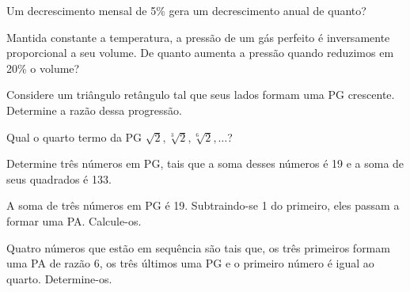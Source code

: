 

\begin{exercise}
    Um decrescimento mensal de 5\% gera um decrescimento anual de
quanto?
\end{exercise}


\begin{exercise}
    Mantida constante a temperatura, a pressão de um gás perfeito é
inversamente proporcional a seu volume. De quanto aumenta a pressão
quando reduzimos em 20\% o volume?
\end{exercise}



\begin{exercise}
    Considere um triângulo retângulo tal que seus lados formam uma
PG crescente. Determine a razão dessa progressão.
\end{exercise}

\begin{exercise}
    Qual o quarto termo da PG $\sqrt 2 , \sqrt[3] 2 , \sqrt[6] 2 ,
\dots$?
\end{exercise}

\begin{exercise}
    Determine três números em PG, tais que a soma desses números é
19 e a soma de seus quadrados é 133.
\end{exercise}

\begin{exercise}
    A soma de três números em PG é 19. Subtraindo-se 1 do primeiro,
eles passam a formar uma PA. Calcule-os.
\end{exercise}

\begin{exercise}
    Quatro números que estão em sequência são tais que, os três
primeiros formam uma PA de razão 6, os três últimos uma PG e o
primeiro número é igual ao quarto. Determine-os.
\end{exercise}

